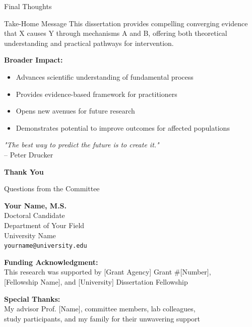 \documentclass[aspectratio=169,12pt]{beamer}
\begin{document}
\begin{frame}{Final Thoughts}
  \begin{block}{Take-Home Message}
    This dissertation provides compelling converging evidence that X causes Y through mechanisms A and B, offering both theoretical understanding and practical pathways for intervention.
  \end{block}
  
  \vspace{1cm}
  
  \textbf{Broader Impact:}
  \begin{itemize}
    \item Advances scientific understanding of fundamental process
    \item Provides evidence-based framework for practitioners
    \item Opens new avenues for future research
    \item Demonstrates potential to improve outcomes for affected populations
  \end{itemize}
  
  \vspace{1cm}
  
  \begin{center}
    \textit{"The best way to predict the future is to create it."} \\
    -- Peter Drucker
  \end{center}
\end{frame}

\begin{frame}[plain]
  \begin{center}
    {\LARGE \textbf{Thank You}}
    
    \vspace{1cm}
    
    {\Large Questions from the Committee}
    
    \vspace{1.5cm}
    
    \textbf{Your Name, M.S.}\\
    Doctoral Candidate\\
    Department of Your Field\\
    University Name\\
    \texttt{yourname@university.edu}
    
    \vspace{1cm}
    
    {\footnotesize
      \textbf{Funding Acknowledgment:}\\
      This research was supported by [Grant Agency] Grant \#[Number],\\
      {[Fellowship Name]}, and [University] Dissertation Fellowship
      
      \vspace{0.5cm}
      
      \textbf{Special Thanks:}\\
      My advisor Prof. [Name], committee members, lab colleagues,\\
      study participants, and my family for their unwavering support
    }
  \end{center}
\end{frame}
\end{document}
